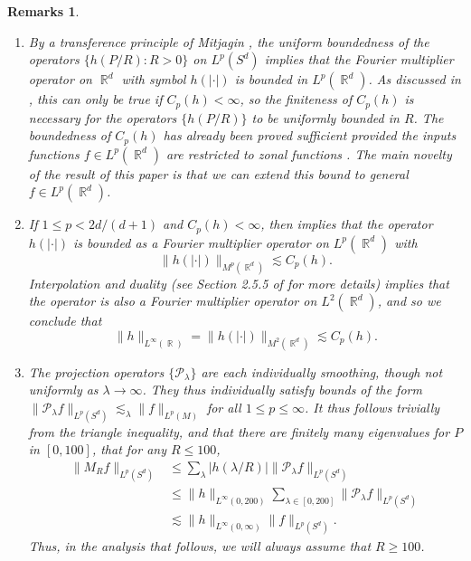 \documentclass[dvipsnames,letterpaper,12pt]{article}
\DeclareMathOperator{\RR}{\mathbb{R}}
\newtheorem{remarks}[theorem]{Remarks}
\begin{document}
\begin{remarks}
    \ 
\begin{enumerate}
    \item By a transference principle of Mitjagin \cite{Mitjagin}, the uniform boundedness of the operators $\{ h(P/R) : R > 0 \}$ on $L^p(S^d)$ implies that the Fourier multiplier operator on $\RR^d$ with symbol $h(|\cdot|)$ is bounded in $L^p(\RR^d)$. As discussed in \cite{HeoandNazarovandSeeger}, this can only be true if $C_p(h) < \infty$, so the finiteness of $C_p(h)$ is necessary for the operators $\{ h(P/R) \}$ to be uniformly bounded in $R$. The boundedness of $C_p(h)$ has already been proved sufficient provided the inputs functions $f \in L^p(\RR^d)$ are restricted to \emph{zonal} functions \cite{Alladi}. The main novelty of the result of this paper is that we can extend this bound to general $f \in L^p(\RR^d)$.

    \item If $1 \leq p < 2d/(d+1)$ and $C_p(h) < \infty$, then \cite{HeoandNazarovandSeeger} implies that the operator $h(|\cdot|)$ is bounded as a Fourier multiplier operator on $L^p(\RR^d)$ with
    \[ \| h(|\cdot|) \|_{M^p(\RR^d)} \lesssim C_p(h). \]
    Interpolation and duality (see Section 2.5.5 of \cite{Grafakos} for more details) implies that the operator is also a Fourier multiplier operator on $L^2(\RR^d)$, and so we conclude that
    \[ \| h \|_{L^\infty(\RR)} = \| h( |\cdot| ) \|_{M^2(\RR^d)} \lesssim C_p(h). \]

    \item The projection operators $\{ \mathcal{P}_\lambda \}$ are each individually smoothing, though not uniformly as $\lambda \to \infty$. They thus individually satisfy bounds of the form $\| \mathcal{P}_\lambda f \|_{L^p(S^d)} \lesssim_\lambda \| f \|_{L^p(M)}$ for all $1 \leq p \leq \infty$. It thus follows trivially from the triangle inequality, and that there are finitely many eigenvalues for $P$ in $[0,100]$, that for any $R \leq 100$,
    \begin{align*}
        \| M_R f \|_{L^p(S^d)} &\leq \sum_\lambda |h(\lambda/R)| \| \mathcal{P}_\lambda f \|_{L^p(S^d)}\\
        &\leq \| h \|_{L^\infty(0,200)} \sum\nolimits_{\lambda \in [0,200]} \| \mathcal{P}_\lambda f \|_{L^p(S^d)}\\
        &\lesssim \| h \|_{L^\infty(0,\infty)} \| f \|_{L^p(S^d)}.
    \end{align*}
    Thus, in the analysis that follows, we will always assume that $R \geq 100$.


\end{enumerate}
\end{remarks}
\end{document}
